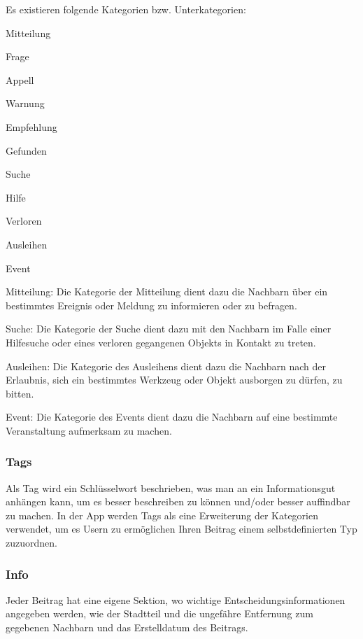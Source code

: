 Es existieren folgende Kategorien bzw. Unterkategorien:

\begin{compactitem}
    \item Mitteilung
    \begin{compactitem}
        \item Frage
        \item Appell
        \item Warnung
        \item Empfehlung
        \item Gefunden
    \end{compactitem}
    \item Suche
    \begin{compactitem}
        \item Hilfe
        \item Verloren
    \end{compactitem}
    \item Ausleihen
    \item Event
\end{compactitem}



Mitteilung:
Die Kategorie der Mitteilung dient dazu die Nachbarn über ein bestimmtes Ereignis oder Meldung zu informieren oder zu befragen.

Suche:
Die Kategorie der Suche dient dazu mit den Nachbarn im Falle einer Hilfesuche oder eines verloren gegangenen Objekts in Kontakt zu treten.

Ausleihen:
Die Kategorie des Ausleihens dient dazu die Nachbarn nach der Erlaubnis, sich ein bestimmtes Werkzeug oder Objekt ausborgen zu dürfen, zu bitten.

Event:
Die Kategorie des Events dient dazu die Nachbarn auf eine bestimmte Veranstaltung aufmerksam zu machen.


\subsubsection{Tags}
\author{Sandin Habibovic}
Als Tag wird ein Schlüsselwort beschrieben, was man an ein Informationsgut anhängen kann, um es besser beschreiben zu können und/oder besser auffindbar zu machen. In der App werden Tags als eine Erweiterung der Kategorien verwendet, um es Usern zu ermöglichen Ihren Beitrag einem selbstdefinierten Typ zuzuordnen.

\subsubsection{Info}
\author{Sandin Habibovic}
Jeder Beitrag hat eine eigene Sektion, wo wichtige Entscheidungsinformationen angegeben werden, wie der Stadtteil und die ungefähre Entfernung zum gegebenen Nachbarn und das Erstelldatum des Beitrags.

